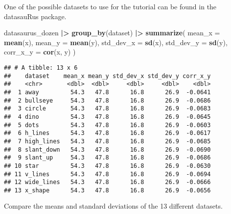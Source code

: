 \documentclass[
]{article}
\newenvironment{Shaded}{\begin{snugshade}}{\end{snugshade}}
\newcommand{\AttributeTok}[1]{\textcolor[rgb]{0.13,0.29,0.53}{#1}}
\newcommand{\FunctionTok}[1]{\textcolor[rgb]{0.13,0.29,0.53}{\textbf{#1}}}
\newcommand{\NormalTok}[1]{#1}
\newcommand{\OtherTok}[1]{\textcolor[rgb]{0.56,0.35,0.01}{#1}}
\newcommand{\SpecialCharTok}[1]{\textcolor[rgb]{0.81,0.36,0.00}{\textbf{#1}}}
\newcommand{\StringTok}[1]{\textcolor[rgb]{0.31,0.60,0.02}{#1}}
\begin{document}
One of the possible datasets to use for the tutorial can be found in the
datasauRus package.

\begin{Shaded}
\begin{Highlighting}[]
\NormalTok{datasaurus\_dozen }\SpecialCharTok{|\textgreater{}} 
  \FunctionTok{group\_by}\NormalTok{(dataset) }\SpecialCharTok{|\textgreater{}} 
  \FunctionTok{summarize}\NormalTok{(}
      \AttributeTok{mean\_x    =} \FunctionTok{mean}\NormalTok{(x),}
      \AttributeTok{mean\_y    =} \FunctionTok{mean}\NormalTok{(y),}
      \AttributeTok{std\_dev\_x =} \FunctionTok{sd}\NormalTok{(x),}
      \AttributeTok{std\_dev\_y =} \FunctionTok{sd}\NormalTok{(y),}
      \AttributeTok{corr\_x\_y  =} \FunctionTok{cor}\NormalTok{(x, y)}
\NormalTok{      )}
\end{Highlighting}
\end{Shaded}

\begin{verbatim}
## # A tibble: 13 x 6
##    dataset    mean_x mean_y std_dev_x std_dev_y corr_x_y
##    <chr>       <dbl>  <dbl>     <dbl>     <dbl>    <dbl>
##  1 away         54.3   47.8      16.8      26.9  -0.0641
##  2 bullseye     54.3   47.8      16.8      26.9  -0.0686
##  3 circle       54.3   47.8      16.8      26.9  -0.0683
##  4 dino         54.3   47.8      16.8      26.9  -0.0645
##  5 dots         54.3   47.8      16.8      26.9  -0.0603
##  6 h_lines      54.3   47.8      16.8      26.9  -0.0617
##  7 high_lines   54.3   47.8      16.8      26.9  -0.0685
##  8 slant_down   54.3   47.8      16.8      26.9  -0.0690
##  9 slant_up     54.3   47.8      16.8      26.9  -0.0686
## 10 star         54.3   47.8      16.8      26.9  -0.0630
## 11 v_lines      54.3   47.8      16.8      26.9  -0.0694
## 12 wide_lines   54.3   47.8      16.8      26.9  -0.0666
## 13 x_shape      54.3   47.8      16.8      26.9  -0.0656
\end{verbatim}

Compare the means and standard deviations of the 13 different datasets.

\begin{Shaded}
\end{Shaded}
\end{document}
